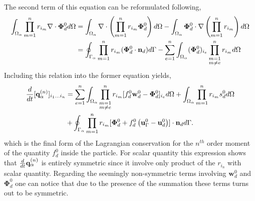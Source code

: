 The second term of this equation can be reformulated following,
\begin{align*}
    \int_{\Omega_{\alpha}}  \prod_{m=1}^{n} r_{i_m} \mathbf{\nabla}\cdot\bm\Phi_d^0  d\Omega
    &= \int_{\Omega_{\alpha}}  \mathbf{\nabla}\cdot \left(\prod_{m=1}^{n} r_{i_m} \bm\Phi_d^0 \right) d\Omega
    - \int_{\Omega_{\alpha}}  \bm\Phi_d^0 \cdot \mathbf{\nabla} \left(\prod_{m=1}^{n} r_{i_m} \right) d\Omega\\
    &= \oint_{\Gamma_{\alpha}}  \prod_{m=1}^{n} r_{i_m} (\bm\Phi_d^0 \cdot \textbf{n}_d) d\Gamma
    -\sum_{e=1}^{n} 
    \int_{\Omega_{\alpha}}  (\bm\Phi_d^0)_{i_e}  \prod^{n}_{\substack{ m=1 \\m \neq e}} r_{i_m}   d\Omega
\end{align*}
Including this relation into the former equation yields, 
\begin{multline}
    \frac{d}{dt} {[\textbf{q}_\alpha^{(n)}]_{i_1\ldots i_n}}
    = \sum_{e=1}^{n} 
    \int_{\Omega_{\alpha}} 
        \prod^{n}_{\substack{ m=1 \\m \neq e}} r_{i_m} [f_d^0 \textbf{w}_d^0  - \bm\Phi_d^0]_{i_e}
     d\Omega
    + \int_{\Omega_{\alpha}}  \prod_{m=1}^{n} r_{i_m} s_d^0  d\Omega\\
    +\oint_{\Gamma_{\alpha}}  \prod_{m=1}^{n} r_{i_m} [\bm\Phi_d^0 + f_d^0 \left(\textbf{u}_\Gamma^0 - \textbf{u}_d^0\right)]\cdot \textbf{n}_d  d\Gamma.
    \label{eq:dt_q_n}
\end{multline}
which is the final form of the Lagrangian conservation for the $n^{th}$ order moment of the quantity $f_d^0$ inside the particle. 
For scalar quantity this expression shows that $\frac{d}{dt} \textbf{q}_\alpha^{(n)}$ is entirely symmetric since it involve only product of the $r_{i_n}$ with scalar quantity. 
Regarding the seemingly non-symmetric terms involving $\textbf{w}_d^0$ and $\bm\Phi_d^0$ one can notice that due to the presence of the summation these terms turns out to be symmetric. 


